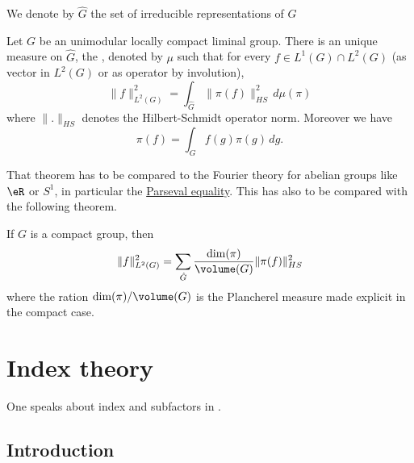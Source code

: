 We denote by $\hat G$ the set of irreducible representations of $G$

\begin{theorem}
	Let $G$ be an unimodular locally compact liminal group. There is an unique measure on $\hat G$, the , denoted by $\mu$ such that for every $f\in L^1(G)\cap L^2(G)$ (as vector in $L^2(G)$ or as operator by involution),
	\begin{equation}
		\| f \|^2_{L^2(G)}=\int_{\hat G}\| \pi(f) \|^2_{HS}\,d\mu(\pi)
	\end{equation}
	where $\| . \|_{HS}$ denotes the Hilbert-Schmidt operator norm. Moreover we have
	\begin{equation}
		\pi(f)=\int_G f(g)\pi(g)\,dg.
	\end{equation}
\end{theorem}

That theorem has to be compared to the Fourier theory for abelian groups like $\eR$ or $S^1$, in particular the \href{http://en.wikipedia.org/wiki/Parseval's_identity}{Parseval equality}. This has also to be compared with the following theorem.

\begin{theorem}
If $G$ is a compact group, then
\begin{equation}
	\| f \|_{L^2(G)}^2=\sum_{\hat G}\frac{ \dim(\pi) }{ \volume(G) }\| \pi(f) \|^2_{HS}
\end{equation}
where the ration $\dim(\pi)/\volume(G)$ is the Plancherel measure made explicit in the compact case.
\end{theorem}


					\section{Index theory}


One speaks about index and subfactors in \cite{JonesVN,ConnesNCG,JonesSunder}.

					\subsection{Introduction}



